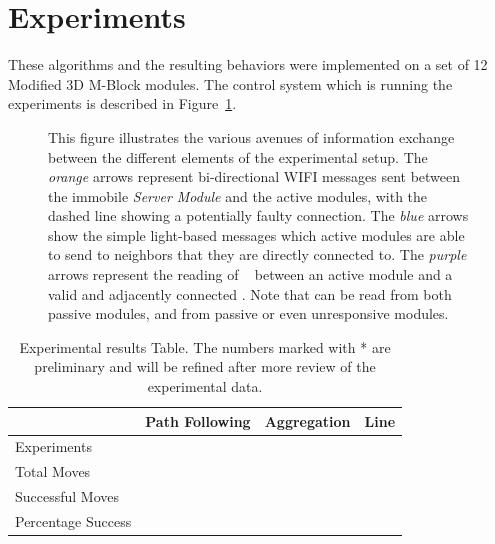\section{Experiments}
\label{sec:Experiments}

These algorithms and the resulting behaviors were implemented on a set of 12 Modified 3D M-Block modules. The control system which is running the experiments is described in Figure~\ref{fig:electroncsChart}.

\begin{figure}[ht]

	
	
\caption{This figure illustrates the various avenues of information exchange between the different elements of the experimental setup. The \emph{orange} arrows represent bi-directional WIFI messages sent between the immobile \emph{Server Module} and the active modules, with the dashed line showing a potentially faulty connection. The \emph{blue} arrows show the simple light-based messages which active modules are able to send to neighbors that they are directly connected to. The \emph{purple} arrows represent the reading of \tagNamePlural~ between an active module and a valid and adjacently connected \tagName. Note that \tagNamePlural can be read from both passive modules, and from passive or even unresponsive modules.}
	
	\label{fig:electroncsChart}
\end{figure}

\begin{table}[h]
	\caption{Experimental results Table. The numbers marked with * are preliminary and will be refined after more review of the experimental data.}
	
	\begin{tabular}{ p{2.2cm}  p{1.8cm}  p{1.4cm} p{1.3cm} }
		\hline
							& Path Following& Aggregation 	& Line		\\
		\hline
		Experiments			&   			& 				&  			\\
		Total Moves 		& 				&  				&	  		\\ 		
		Successful Moves	&				& 				& 			\\
		Percentage Success	& 				& 				& 			\\
		
		
		
		
		
	\end{tabular}
	
	\label{tab:info}
\end{table}

